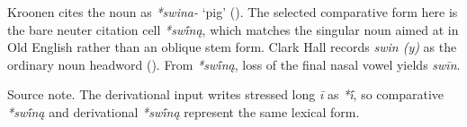 \documentclass[
  british,
  a4paper,
]{article}
\begin{document}
\noindent{} \endgroup

Kroonen cites the noun as \emph{*swina-} `pig'
(). The selected
comparative form here is the bare neuter citation cell \emph{*swī́ną},
which matches the singular noun aimed at in Old English rather than an
oblique stem form. Clark Hall records \emph{swin (y)} as the ordinary
noun headword (). From
\emph{*swī́ną}, loss of the final nasal vowel yields \emph{swīn}.

Source note. The derivational input writes stressed long \emph{ī} as
\emph{*ī́}, so comparative \emph{*swī́ną} and derivational \emph{*swī́ną}
represent the same lexical form.
\end{document}
